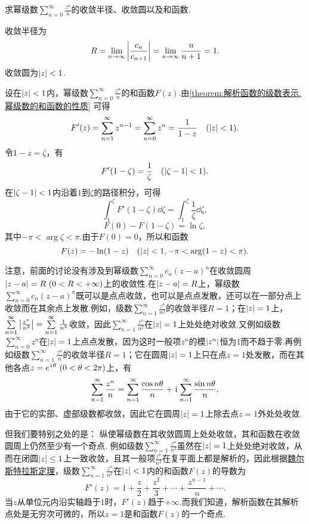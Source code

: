 \begin{example}
求幂级数\(\sum\limits_{n=0}^\infty \frac{z^n}{n}\)的收敛半径、收敛圆以及和函数.
\begin{solution}
收敛半径为\[
R = \lim\limits_{n\to\infty} \abs{\frac{c_n}{c_{n+1}}} = \lim\limits_{n\to\infty} \frac{n}{n+1} = 1.
\]收敛圆为\(\abs{z} < 1\).

设在\(\abs{z} < 1\)内，幂级数\(\sum\limits_{n=0}^\infty \frac{z^n}{n}\)的和函数\(F(z)\).由\cref{theorem:解析函数的级数表示.幂级数的和函数的性质} 可得\[
F'(z) = \sum\limits_{n=1}^\infty z^{n-1}
= \sum\limits_{n=0}^\infty z^n
= \frac{1}{1-z}
\quad(\abs{z} < 1).
\]令\(1-z = \zeta\)，有\[
F'(1-\zeta) = \frac{1}{\zeta}
\quad(\abs{\zeta-1}<1).
\]在\(\abs{\zeta-1}<1\)内沿着\(1\)到\(\zeta\)的路径积分，可得\[
\int_1^{\zeta} F'(1-\zeta) \dd{\zeta}
= \int_1^{\zeta} \frac{1}{\zeta} \dd{\zeta},
\]\[
F(0) - F(1-\zeta)
= \ln \zeta,
\]其中\(-\pi < \arg \zeta < \pi\).由于\(F(0) = 0\)，所以和函数\[
F(z) = -\ln(1-z)
\quad(\abs{z}<1, -\pi < \arg(1-z) < \pi).
\]
\end{solution}
\end{example}
注意，前面的讨论没有涉及到幂级数\(\sum\limits_{n=0}^\infty c_n (z-a)^n\)在收敛圆周\(\abs{z-a}=R\ (0<R<+\infty)\)上的收敛性.在\(\abs{z-a}=R\)上，幂级数\(\sum\limits_{n=0}^\infty c_n (z-a)^n\)既可以是点点收敛，也可以是点点发散，还可以在一部分点上收敛而在其余点上发散.例如，级数\(\sum\limits_{n=1}^\infty \frac{z^n}{n^2}\)的收敛半径\(R=1\)；在\(\abs{z}=1\)上，\(\sum\limits_{n=1}^\infty \abs{\frac{z^n}{n^2}} = \sum\limits_{n=1}^\infty \frac{1}{n^2}\)收敛，因此\(\sum\limits_{n=1}^\infty \frac{z^n}{n^2}\)在\(\abs{z}=1\)上处处绝对收敛.又例如级数\(\sum\limits_{n=0}^\infty z^n\)在\(\abs{z}=1\)上点点发散，因为这时一般项\(z^n\)的模\(\abs{z^n}\)恒为\(1\)而不趋于零.再例如级数\(\sum\limits_{n=1}^\infty \frac{z^n}{n}\)的收敛半径\(R=1\)；它在圆周\(\abs{z}=1\)上只在点\(z=1\)处发散，而在其他各点\(z = e^{\iu\theta}\ (0<\theta<2\pi)\)上，有\[
\sum\limits_{n=1}^\infty \frac{z^n}{n}
= \sum\limits_{n=1}^\infty \frac{\cos n\theta}{n}
+ \kern1pt\mathrm{i}\kern1pt\sum\limits_{n=1}^\infty \frac{\sin n\theta}{n},
\]由于它的实部、虚部级数都收敛，因此它在圆周\(\abs{z}=1\)上除去点\(z=1\)外处处收敛.

但我们要特别之处的是：
纵使幂级数在其收敛圆周上处处收敛，其和函数在收敛圆周上仍然至少有一个奇点.
例如级数\(\sum\limits_{n=1}^\infty \frac{z^n}{n^2}\)虽然在\(\abs{z}=1\)上处处绝对收敛，从而在闭圆\(\abs{z}\leq1\)上一致收敛，且其一般项\(\frac{z^n}{n^2}\)在复平面上都是解析的，因此根据\hyperref[theorem:解析函数的级数表示.魏尔斯特拉斯定理]{魏尔斯特拉斯定理}，级数\(\sum\limits_{n=1}^\infty \frac{z^n}{n^2}\)在\(\abs{z}<1\)内的和函数\(F(z)\)的导数为\[
F'(z) = 1 + \frac{z}{2} + \frac{z^2}{3} + \dotsb + \frac{z^{n-1}}{n} + \dotsb.
\]当\(z\)从单位元内沿实轴趋于\(1\)时，\(F'(z)\)趋于\(+\infty\).而我们知道，解析函数在其解析点处是无穷次可微的，所以\(z=1\)是和函数\(F(z)\)的一个奇点.


